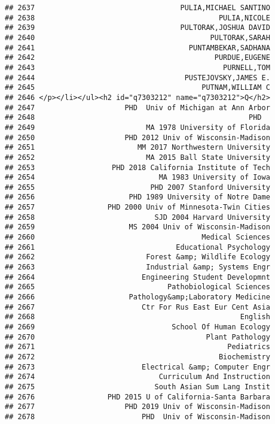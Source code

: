 \documentclass[
]{article}
\begin{document}
\begin{verbatim}
## 2637                                  PULIA,MICHAEL SANTINO
## 2638                                           PULIA,NICOLE
## 2639                                  PULTORAK,JOSHUA DAVID
## 2640                                         PULTORAK,SARAH
## 2641                                    PUNTAMBEKAR,SADHANA
## 2642                                          PURDUE,EUGENE
## 2643                                            PURNELL,TOM
## 2644                                   PUSTEJOVSKY,JAMES E.
## 2645                                       PUTNAM,WILLIAM C
## 2646 </p></li></ul><h2 id="q7303212" name="q7303212">Q</h2>
## 2647                     PHD  Univ of Michigan at Ann Arbor
## 2648                                                  PHD  
## 2649                          MA 1978 University of Florida
## 2650                     PHD 2012 Univ of Wisconsin-Madison
## 2651                        MM 2017 Northwestern University
## 2652                          MA 2015 Ball State University
## 2653                  PHD 2018 California Institute of Tech
## 2654                             MA 1983 University of Iowa
## 2655                           PHD 2007 Stanford University
## 2656                      PHD 1989 University of Notre Dame
## 2657                 PHD 2000 Univ of Minnesota-Twin Cities
## 2658                            SJD 2004 Harvard University
## 2659                      MS 2004 Univ of Wisconsin-Madison
## 2660                                       Medical Sciences
## 2661                                 Educational Psychology
## 2662                          Forest &amp; Wildlife Ecology
## 2663                          Industrial &amp; Systems Engr
## 2664                         Engineering Student Developmnt
## 2665                               Pathobiological Sciences
## 2666                      Pathology&amp;Laboratory Medicine
## 2667                         Ctr For Rus East Eur Cent Asia
## 2668                                                English
## 2669                                School Of Human Ecology
## 2670                                        Plant Pathology
## 2671                                             Pediatrics
## 2672                                           Biochemistry
## 2673                         Electrical &amp; Computer Engr
## 2674                             Curriculum And Instruction
## 2675                            South Asian Sum Lang Instit
## 2676                 PHD 2015 U of California-Santa Barbara
## 2677                     PHD 2019 Univ of Wisconsin-Madison
## 2678                         PHD  Univ of Wisconsin-Madison

\end{verbatim}
\end{document}
